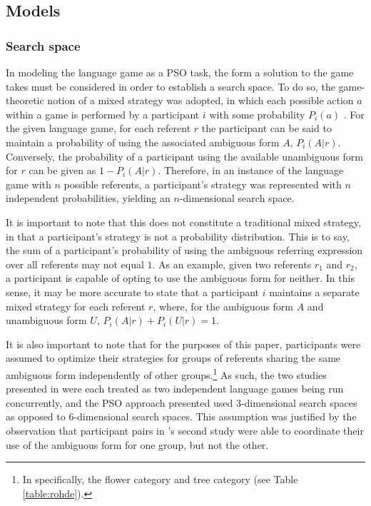 \documentclass[11pt]{article}
\begin{document}
\subsection{Models}
\subsubsection{Search space}
\label{sec:search_space}

In modeling the \citeauthor{rohde2012} language game as a PSO task, the form a solution to the game takes must be considered in order to establish a search space.  To do so, the game-theoretic notion of a mixed strategy was adopted, in which each possible action $a$ within a game is performed by a participant $i$ with some probability $P_i(a)$ \citep{benz2005}. For the given language game, for each referent $r$ the participant can be said to maintain a probability of using the associated ambiguous form $A$, $P_i(A|r)$. Conversely, the probability of a participant using the available unambiguous form for $r$ can be given as $1 - P_i(A|r)$. Therefore, in an instance of the \citeauthor{rohde2012} language game with $n$ possible referents, a participant's strategy was represented with $n$ independent probabilities, yielding an $n$-dimensional search space. 

It is important to note that this does not constitute a traditional mixed strategy, in that a participant's strategy is not a probability distribution. This is to say, the sum of a participant's probability of using the ambiguous referring expression over all referents may not equal $1$. As an example, given two referents $r_1$ and $r_2$, a participant is capable of opting to use the ambiguous form for neither. In this sense, it may be more accurate to state that a participant $i$ maintains a separate mixed strategy for each referent $r$, where, for the ambiguous form $A$ and unambiguous form $U$, $P_i(A|r) + P_i(U|r) = 1$.

It is also important to note that for the purposes of this paper, participants were assumed to optimize their strategies for groups of referents sharing the same ambiguous form independently of other groups.\footnote{In \citeauthor{rohde2012} specifically, the flower category and tree category (see Table \ref{table:rohde}).} As such, the two studies presented in \citeauthor{rohde2012} were each treated as two independent language games being run concurrently, and the PSO approach presented used 3-dimensional search spaces as opposed to 6-dimensional search spaces. This assumption was justified by the observation that participant pairs in \citeauthor{rohde2012}'s second study were able to coordinate their use of the ambiguous form for one group, but not the other. 
\end{document}
